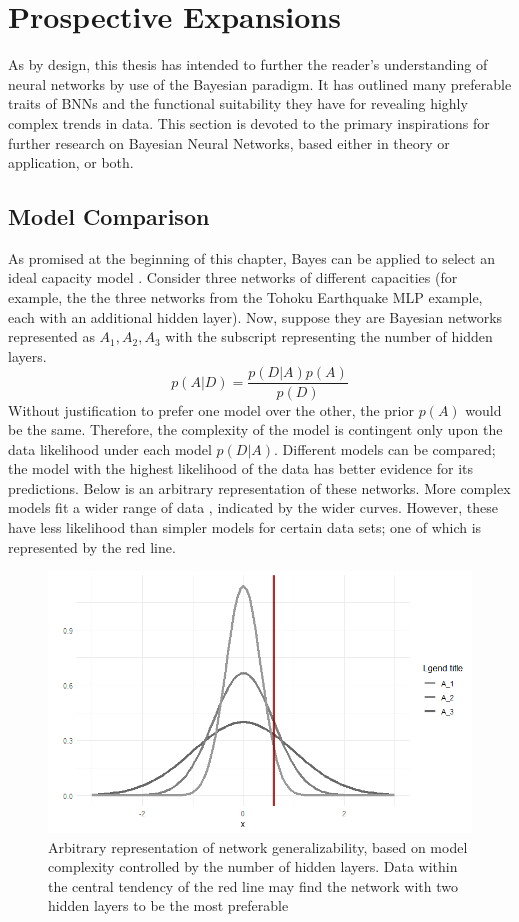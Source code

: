







\section{Prospective Expansions}

As by design, this thesis has intended to further the reader's understanding of neural networks by use of the Bayesian paradigm.  It has outlined many preferable traits of BNNs and the functional suitability they have for revealing highly complex trends in data.
This section is devoted to the primary inspirations for further research on Bayesian Neural Networks, based either in theory or application, or both.

\subsection{Model Comparison}
As promised at the beginning of this chapter, Bayes can be applied to select an ideal capacity model \cite{bishop1997bayesian}.  Consider three networks of different capacities (for example, the the three networks from the Tohoku Earthquake MLP example, each with an additional hidden layer).  Now, suppose they are Bayesian networks represented as $A_1, A_2, A_3$ with the subscript representing the number of hidden layers.
$$
p(A|D) = \frac{p(D|A)p(A)}{p(D)}
$$
Without justification to prefer one model over the other, the prior $p(A)$ would be the same.  Therefore, the complexity of the model is contingent only upon the data likelihood under each model $p(D|A)$.  Different models can be compared; the model with the highest likelihood of the data has better evidence for its predictions. Below is an arbitrary representation of these networks.  More complex models fit a wider range of data \cite{bishop1997bayesian}, indicated by the wider curves.  However, these have less likelihood than simpler models for certain data sets; one of which is represented by the red line.

\begin{figure}[H]
    \centering
    \includegraphics[width = .6\textwidth]{Figures/BNN_modelcheck.png}
    \caption{\footnotesize{Arbitrary representation of network generalizability, based on model complexity controlled by the number of hidden layers. Data within the central tendency of the red line may find the network with two hidden layers to be the most preferable}}
    \label{BNNmodelcheck}
\end{figure}

